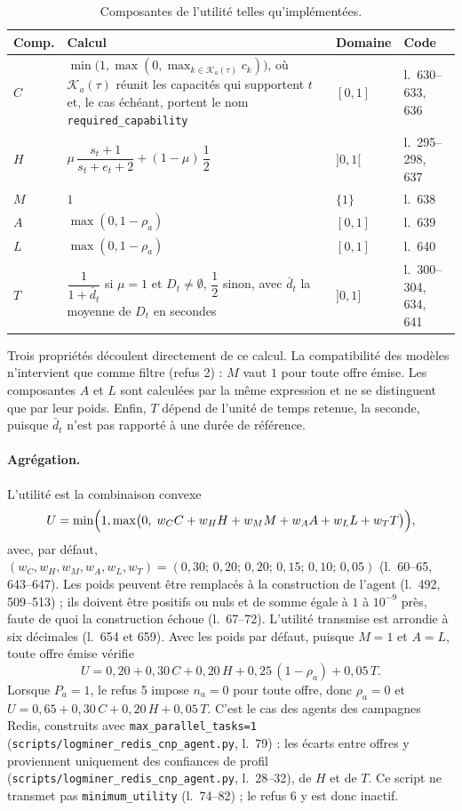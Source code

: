 \begin{table}[H]
\centering
\caption{Composantes de l'utilité telles qu'implémentées.}
\label{tab:spec-utilite}
\small
\begin{tabularx}{\textwidth}{p{} p{} p{} X}
\toprule
\textbf{Comp.} & \textbf{Calcul} & \textbf{Domaine} & \textbf{Code} \\
\midrule
$C$ & $\min\bigl(1, \max(0, \max_{k \in \mathcal{K}_a(\tau)} c_k)\bigr)$, où
$\mathcal{K}_a(\tau)$ réunit les capacités qui supportent $t$ et, le cas
échéant, portent le nom \texttt{required\_capability} &
$[0, 1]$ & l.~630--633, 636 \\
$H$ & $\mu\,\dfrac{s_t + 1}{s_t + e_t + 2} + (1 - \mu)\,\dfrac{1}{2}$ &
$]0, 1[$ & l.~295--298, 637 \\
$M$ & $1$ & $\{1\}$ & l.~638 \\
$A$ & $\max(0, 1 - \rho_a)$ & $[0, 1]$ & l.~639 \\
$L$ & $\max(0, 1 - \rho_a)$ & $[0, 1]$ & l.~640 \\
$T$ & $\dfrac{1}{1 + \bar d_t}$ si $\mu = 1$ et $D_t \neq \emptyset$,
$\dfrac{1}{2}$ sinon, avec $\bar d_t$ la moyenne de $D_t$ en secondes &
$]0, 1]$ & l.~300--304, 634, 641 \\
\bottomrule
\end{tabularx}
\end{table}

Trois propriétés découlent directement de ce calcul. La compatibilité des
modèles n'intervient que comme filtre (refus 2) : $M$ vaut $1$ pour toute
offre émise. Les composantes $A$ et $L$ sont calculées par la même expression
et ne se distinguent que par leur poids. Enfin, $T$ dépend de l'unité de
temps retenue, la seconde, puisque $\bar d_t$ n'est pas rapporté à une durée
de référence.

\paragraph{Agrégation.}
L'utilité est la combinaison convexe
\[
U = \min\Bigl(1, \max\bigl(0,\; w_C C + w_H H + w_M M + w_A A + w_L L + w_T T\bigr)\Bigr),
\]
avec, par défaut,
$(w_C, w_H, w_M, w_A, w_L, w_T) = (0{,}30;\, 0{,}20;\, 0{,}20;\, 0{,}15;\, 0{,}10;\, 0{,}05)$
(l.~60--65, 643--647). Les poids peuvent être remplacés à la construction de
l'agent (l.~492, 509--513) ; ils doivent être positifs ou nuls et de somme
égale à $1$ à $10^{-9}$ près, faute de quoi la construction échoue
(l.~67--72). L'utilité transmise est arrondie à six décimales
(l.~654 et 659). Avec les poids par défaut, puisque $M = 1$ et $A = L$, toute
offre émise vérifie
\[
U = 0{,}20 + 0{,}30\,C + 0{,}20\,H + 0{,}25\,(1 - \rho_a) + 0{,}05\,T .
\]
Lorsque $P_a = 1$, le refus 5 impose $n_a = 0$ pour toute offre, donc
$\rho_a = 0$ et $U = 0{,}65 + 0{,}30\,C + 0{,}20\,H + 0{,}05\,T$. C'est le cas
des agents des campagnes Redis, construits avec \texttt{max\_parallel\_tasks=1}
(\texttt{scripts/logminer\_redis\_cnp\_agent.py}, l.~79) : les écarts entre
offres y proviennent uniquement des confiances de profil
(\texttt{scripts/logminer\_redis\_cnp\_agent.py}, l.~28--32), de $H$ et de $T$.
Ce script ne transmet pas \texttt{minimum\_utility} (l.~74--82) ; le refus 6
y est donc inactif.

